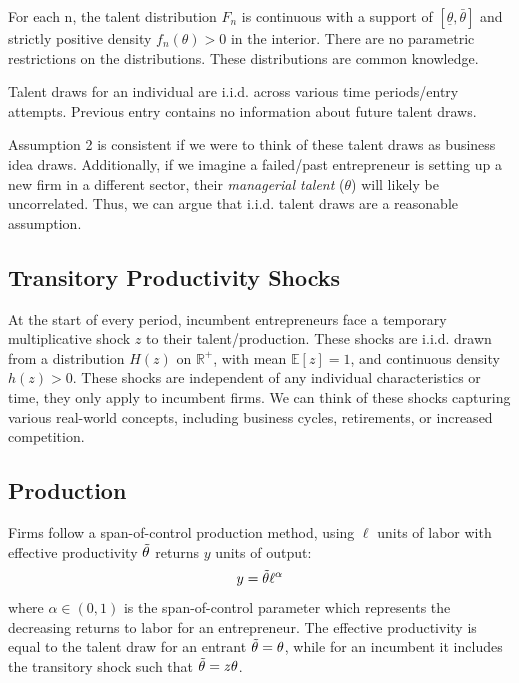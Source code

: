    \begin{assumption} \label{assum:talent_dist}
        For each n, the talent distribution $F_n$ is continuous with a support of $[\underline{\theta}, \bar{\theta}]$ and strictly positive density $f_n(\theta) > 0$ in the interior. There are no parametric restrictions on the distributions. These distributions are common knowledge.
    \end{assumption}
        
    \begin{assumption} \label{assum:draws}
        Talent draws for an individual are i.i.d. across various time periods/entry attempts. Previous entry contains no information about future talent draws.
    \end{assumption}

    Assumption 2 is consistent if we were to think of these talent draws as business idea draws. Additionally, if we imagine a failed/past entrepreneur is setting up a new firm in a different sector, their \textit{managerial talent} ($\theta$) will likely be uncorrelated. Thus, we can argue that i.i.d. talent draws are a reasonable assumption. 

\subsection{Transitory Productivity Shocks}

    At the start of every period, incumbent entrepreneurs face a temporary multiplicative shock $z$ to their talent/production. These shocks are i.i.d. drawn from a distribution $H(z)$ on $\mathbb{R}^+$, with mean $\mathbb{E}[z] = 1$, and continuous density $h(z) > 0$. These shocks are independent of any individual characteristics or time, they only apply to incumbent firms. We can think of these shocks capturing various real-world concepts, including business cycles, retirements, or increased competition.  
    
\subsection{Production}

    Firms follow a span-of-control production method, using $\ell$ units of labor with effective productivity $\Tilde{\theta}$ returns $y$ units of output:
    \begin{equation}
        y = \Tilde{\theta} \ell^\alpha
    \end{equation}
    where $\alpha \in (0,1)$ is the span-of-control parameter which represents the decreasing returns to labor for an entrepreneur. The effective productivity is equal to the talent draw for an entrant $\Tilde{\theta} = \theta$, while for an incumbent it includes the transitory shock such that $\Tilde{\theta} = z \theta$.

